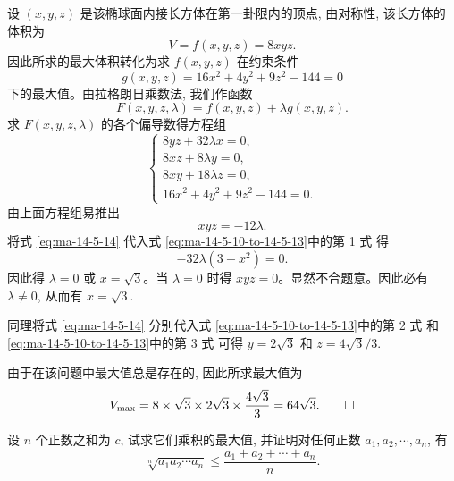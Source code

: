 \begin{solve}
设 $(x,y,z)$ 是该椭球面内接长方体在第一卦限内的顶点, 由对称性, 该长方体的体积为
\[
  V=f(x,y,z)=8xyz.
\]
因此所求的最大体积转化为求 $f(x,y,z)$ 在约束条件
\[
  g(x,y,z)=16x^2+4y^2+9z^2-144=0
\]
下的最大值。由拉格朗日乘数法, 我们作函数
\[
  F(x,y,z,\lambda)=f(x,y,z)+\lambda g(x,y,z).
\]
求 $F(x,y,z,\lambda)$ 的各个偏导数得方程组
\begin{equation}
  \begin{cases}
    8yz+32\lambda x=0,\\
    8xz+8\lambda y=0,\\
    8xy+18\lambda z=0,\\
    16x^2+4y^2+9z^2-144=0.
  \end{cases}
  \label{eq:ma-14-5-10-to-14-5-13}
\end{equation}
由上面方程组易推出
\begin{equation}
  xyz=-12\lambda.
  \label{eq:ma-14-5-14}
\end{equation}
将式 \eqref{eq:ma-14-5-14} 代入式 \eqref{eq:ma-14-5-10-to-14-5-13}中的第 1 式 得
\[
  -32\lambda(3-x^2)=0.
\]
因此得 $\lambda=0$ 或 $x=\sqrt3$。当 $\lambda=0$ 时得 $xyz=0$。显然不合题意。因此必有 $\lambda\ne0$, 从而有 $x=\sqrt3$.

同理将式 \eqref{eq:ma-14-5-14} 分别代入式 \eqref{eq:ma-14-5-10-to-14-5-13}中的第 2 式 和 \eqref{eq:ma-14-5-10-to-14-5-13}中的第 3 式 可得 $y=2\sqrt3$ 和 $z=4\sqrt3/3$.

由于在该问题中最大值总是存在的, 因此所求最大值为
\[
  V_{\max}=8\times\sqrt3\times2\sqrt3\times\frac{4\sqrt3}{3}=64\sqrt3.
\qedhere
\]
\end{solve}


\begin{example}\label{example:ma-14-5-5}
设 $n$ 个正数之和为 $c$, 试求它们乘积的最大值, 并证明对任何正数 $a_1,a_2,\cdots,a_n$, 有
\[
  \sqrt[n]{a_1a_2\cdots a_n}
  \leqslant
  \frac{a_1+a_2+\cdots+a_n}{n}.
\]
\end{example}


